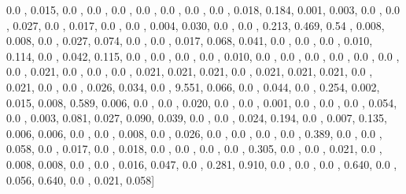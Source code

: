 \documentclass[usenames,dvipsnames]{article} %
\begin{document}
0.0  , 0.015, 0.0  , 0.0  , 0.0  , 0.0  , 0.0  , 0.0  , 0.0  , 0.018, 0.184, 0.001, 0.003, 0.0  , 0.0  , 0.027, 0.0  , 0.017, 0.0  , 0.0  , 0.004, 0.030, 0.0  , 0.0  , 0.213, 0.469, 0.54 , 0.008, 0.008, 0.0  , 0.027, 0.074, 0.0  , 0.0  , 0.017, 0.068, 0.041, 0.0  , 0.0  , 0.0  , 0.010, 0.114, 0.0  , 0.042, 0.115, 0.0  , 0.0  , 0.0  , 0.0  , 0.010, 0.0  , 0.0  , 0.0  , 0.0  , 0.0  , 0.0  , 0.0  , 0.021, 0.0  , 0.0  , 0.0  , 0.021, 0.021, 0.021, 0.0  , 0.021, 0.021, 0.021, 0.0  , 0.021, 0.0  , 0.0  , 0.026, 0.034, 0.0  , 9.551, 0.066, 0.0  , 0.044, 0.0  , 0.254, 0.002, 0.015, 0.008, 0.589, 0.006, 0.0  , 0.0  , 0.020, 0.0  , 0.0  , 0.001, 0.0  , 0.0  , 0.0  , 0.054, 0.0  , 0.003, 0.081, 0.027, 0.090, 0.039, 0.0  , 0.0  , 0.024, 0.194, 0.0  , 0.007, 0.135, 0.006, 0.006, 0.0  , 0.0  , 0.008, 0.0  , 0.026, 0.0  , 0.0  , 0.0  , 0.0  , 0.389, 0.0  , 0.0  , 0.058, 0.0  , 0.017, 0.0  , 0.018, 0.0  , 0.0  , 0.0  , 0.0  , 0.305, 0.0  , 0.0  , 0.021, 0.0  , 0.008, 0.008, 0.0  , 0.0  , 0.016, 0.047, 0.0  , 0.281, 0.910, 0.0  , 0.0  , 0.0  , 0.640, 0.0  , 0.056, 0.640, 0.0  , 0.021, 0.058]
\end{document}
